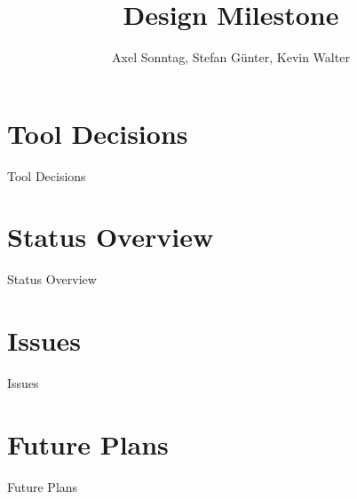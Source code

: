 \documentclass[compress,english]{beamer}
\title{Design Milestone}
\author{Axel Sonntag, Stefan Günter, Kevin Walter}
\institute{Hochschule Aalen}
\begin{document}
\renewcommand{\theFancyVerbLine}{
  \sffamily\textcolor[rgb]{0.5,0.5,0.5}{\scriptsize\arabic{FancyVerbLine}}}

  

\begin{frame}[plain]
  \titlepage
\end{frame}



\section{Tool Decisions}
\begin{frame}[fragile,c]
\begin{block}{Tool Decisions}
  
\end{block}
\end{frame}


\section{Status Overview}
\begin{frame}[fragile,c]
\begin{block}{Status Overview}
  
\end{block}
\end{frame}

\section{Issues}
\begin{frame}[fragile,c]
\begin{block}{Issues}
  
\end{block}
\end{frame}

\section{Future Plans}
\begin{frame}[fragile,c]
\begin{block}{Future Plans}
  
\end{block}
\end{frame}
\end{document}
